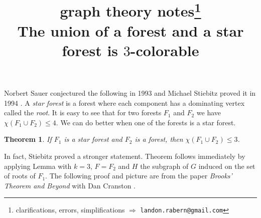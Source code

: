 \documentclass[12pt]{article}
\title{graph theory notes\thanks{clarifications, errors, simplifications $\Rightarrow$ \texttt{landon.rabern@gmail.com}}\\ \bigskip
The union of a forest and a star forest is $3$-colorable}
\date{}
\theoremstyle{plain}
\newtheorem*{Theorem}{Theorem}
\theoremstyle{definition}
\theoremstyle{remark}
\begin{document}
\maketitle
Norbert Sauer conjectured the following in 1993 \cite{sauer} and Michael Stiebitz proved it in 1994 \cite{stiebitz1994forest}.  A \emph{star forest} is a forest where each component has a dominating vertex called the \emph{root}.
It is easy to see that for two forests $F_1$ and $F_2$ we have $\chi(F_1 \cup F_2) \le 4$.  We can do better when one of the forests is a star forest.
\begin{Theorem}
If $F_1$ is a star forest and $F_2$ is a forest, then $\chi(F_1 \cup F_2) \le 3$.
\end{Theorem}

In fact, Stiebitz proved a stronger statement.  Theorem follows immediately by applying Lemma with $k=3$, $F = F_2$ and $H$ the subgraph of $G$ induced on the set of roots of $F_1$.  The following proof and picture are from the paper \emph{Brooks' Theorem and Beyond} with Dan Cranston \cite{brooksbeyond}.
\end{document}
